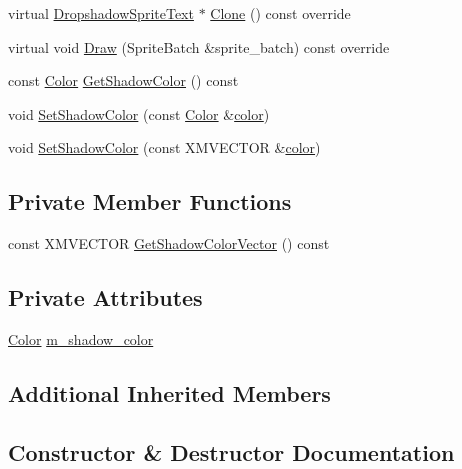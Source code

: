 \begin{DoxyCompactItemize}
\item 
virtual \hyperlink{classmage_1_1_dropshadow_sprite_text}{Dropshadow\+Sprite\+Text} $\ast$ \hyperlink{classmage_1_1_dropshadow_sprite_text_a116c49fb9638414c67a09501c4031a01}{Clone} () const override
\item 
virtual void \hyperlink{classmage_1_1_dropshadow_sprite_text_af76422c9812d7dc38e9b98e587103c67}{Draw} (Sprite\+Batch \&sprite\+\_\+batch) const override
\item 
const \hyperlink{structmage_1_1_color}{Color} \hyperlink{classmage_1_1_dropshadow_sprite_text_a776c11dfe60ad8c0c6f356c5f0f95af6}{Get\+Shadow\+Color} () const
\item 
void \hyperlink{classmage_1_1_dropshadow_sprite_text_abefcf9a3bd234df3996950410eefe1bf}{Set\+Shadow\+Color} (const \hyperlink{structmage_1_1_color}{Color} \&\hyperlink{namespacemage_a56eceea5a9bceb2b56073f3ea4945781}{color})
\item 
void \hyperlink{classmage_1_1_dropshadow_sprite_text_a8069cb327cc61dd92d516c793d9c49e7}{Set\+Shadow\+Color} (const X\+M\+V\+E\+C\+T\+OR \&\hyperlink{namespacemage_a56eceea5a9bceb2b56073f3ea4945781}{color})
\end{DoxyCompactItemize}
\subsection*{Private Member Functions}
\begin{DoxyCompactItemize}
\item 
const X\+M\+V\+E\+C\+T\+OR \hyperlink{classmage_1_1_dropshadow_sprite_text_aedba26fc177c68e0553785a731d3d391}{Get\+Shadow\+Color\+Vector} () const
\end{DoxyCompactItemize}
\subsection*{Private Attributes}
\begin{DoxyCompactItemize}
\item 
\hyperlink{structmage_1_1_color}{Color} \hyperlink{classmage_1_1_dropshadow_sprite_text_a6343fd2b2b2139d8a869c29a2a33531f}{m\+\_\+shadow\+\_\+color}
\end{DoxyCompactItemize}
\subsection*{Additional Inherited Members}


\subsection{Constructor \& Destructor Documentation}
\hypertarget{classmage_1_1_dropshadow_sprite_text_a10b134e06d6bcf04168005630a2934f0}{}\label{classmage_1_1_dropshadow_sprite_text_a10b134e06d6bcf04168005630a2934f0} 

